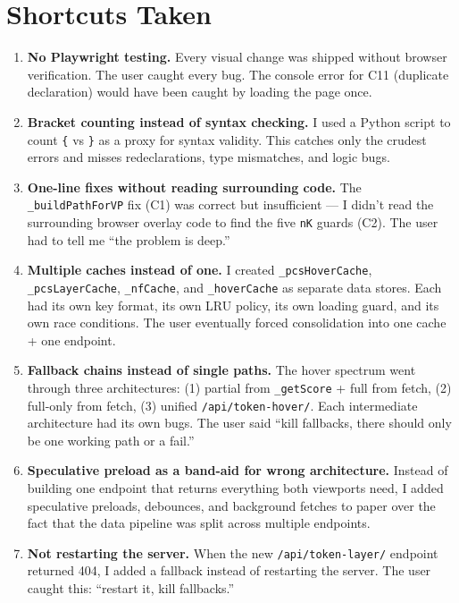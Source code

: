 \documentclass[11pt,a4paper]{article}
\begin{document}
\section{Shortcuts Taken}

\begin{enumerate}
  \item \textbf{No Playwright testing.} Every visual change was shipped without browser verification. The user caught every bug. The console error for C11 (duplicate declaration) would have been caught by loading the page once.

  \item \textbf{Bracket counting instead of syntax checking.} I used a Python script to count \texttt{\{} vs \texttt{\}} as a proxy for syntax validity. This catches only the crudest errors and misses redeclarations, type mismatches, and logic bugs.

  \item \textbf{One-line fixes without reading surrounding code.} The \texttt{\_buildPathForVP} fix (C1) was correct but insufficient --- I didn't read the surrounding browser overlay code to find the five \texttt{nK} guards (C2). The user had to tell me ``the problem is deep.''

  \item \textbf{Multiple caches instead of one.} I created \texttt{\_pcsHoverCache}, \texttt{\_pcsLayerCache}, \texttt{\_nfCache}, and \texttt{\_hoverCache} as separate data stores. Each had its own key format, its own LRU policy, its own loading guard, and its own race conditions. The user eventually forced consolidation into one cache + one endpoint.

  \item \textbf{Fallback chains instead of single paths.} The hover spectrum went through three architectures: (1) partial from \texttt{\_getScore} + full from fetch, (2) full-only from fetch, (3) unified \texttt{/api/token-hover/}. Each intermediate architecture had its own bugs. The user said ``kill fallbacks, there should only be one working path or a fail.''

  \item \textbf{Speculative preload as a band-aid for wrong architecture.} Instead of building one endpoint that returns everything both viewports need, I added speculative preloads, debounces, and background fetches to paper over the fact that the data pipeline was split across multiple endpoints.

  \item \textbf{Not restarting the server.} When the new \texttt{/api/token-layer/} endpoint returned 404, I added a fallback instead of restarting the server. The user caught this: ``restart it, kill fallbacks.''
\end{enumerate}
\end{document}
